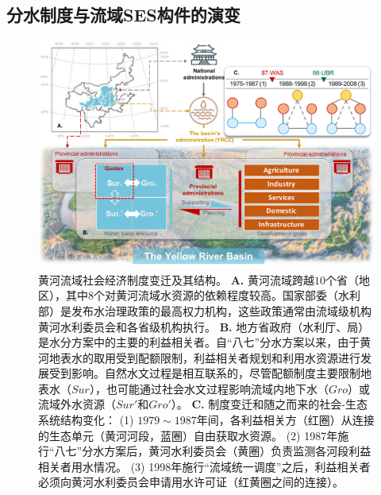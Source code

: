 
\subsection{分水制度与流域SES构件的演变}\label{results-1}

\begin{figure}[!t]
	\includegraphics[width=\linewidth]{img/ch5/diagram.pdf}
	\caption[黄河流域社会经济制度变迁及其结构]{
		黄河流域社会经济制度变迁及其结构。
		\textbf{A.} 黄河流域跨越$10$个省（地区），其中$8$个对黄河流域水资源的依赖程度较高。国家部委（水利部）是发布水治理政策的最高权力机构，这些政策通常由流域级机构黄河水利委员会和各省级机构执行。
		\textbf{B.} 地方省政府（水利厅、局）是水分方案中的主要的利益相关者。自“八七”分水方案以来，由于黄河地表水的取用受到配额限制，利益相关者规划和利用水资源进行发展受到影响。自然水文过程是相互联系的，尽管配额制度主要限制地表水（$Sur$），也可能通过社会水文过程影响流域内地下水（$Gro$）或流域外水资源（$Sur'$和$Gro'$）。
		\textbf{C.} 制度变迁和随之而来的社会-生态系统结构变化：
		(1) $1979 \sim 1987$年间，各利益相关方（红圈）从连接的生态单元（黄河河段，蓝圈）自由获取水资源。
		(2) 1987年施行“八七”分水方案后，黄河水利委员会（黄圈）负责监测各河段利益相关者用水情况。
		(3) 1998年施行“流域统一调度”之后，利益相关者必须向黄河水利委员会申请用水许可证（红黄圈之间的连接）。}\label{fig:structure}
\end{figure}

